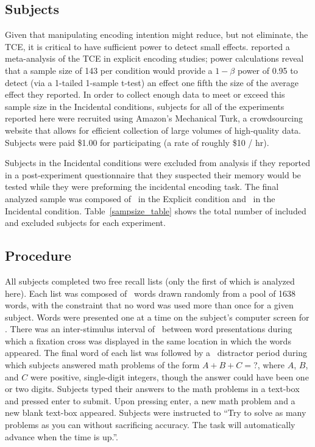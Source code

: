 \documentclass[man,natbib,floatsintext]{apa6} %
\begin{document}
\subsection{Subjects}

Given that manipulating encoding intention might reduce, but not eliminate, the TCE, it is critical to have sufficient power to detect small effects. \citet{SedeEtal10} reported a meta-analysis of the TCE in explicit encoding studies; power calculations reveal that a sample size of 143 per condition would provide a $1-\beta$ power of 0.95 to detect (via a 1-tailed 1-sample t-test) an effect one fifth the size of the average effect they reported. 
In order to collect enough data to meet or exceed this sample size in the Incidental conditions, subjects for all of the experiments reported here were recruited using Amazon's Mechanical Turk, a crowdsourcing website that allows for efficient collection of large volumes of high-quality data. Subjects were paid \$1.00 for participating (a rate of roughly \$10 / hr).

Subjects in the Incidental conditions were excluded from analysis if they reported in a post-experiment questionnaire that they suspected their memory would be tested while they were preforming the incidental encoding task. The final analyzed sample was composed of \shoeExplicitIncluded~in the Explicit condition and \shoeIncidentalIncluded~in the Incidental condition. Table~\ref{sampsize_table} shows the total number of included and excluded subjects for each experiment.

\subsection{Procedure}
All subjects completed two free recall lists (only the first of which is analyzed here). Each list was composed of \listlength~words drawn randomly from a pool of 1638 words, with the constraint that no word was used more than once for a given subject. Words were presented one at a time on the subject's computer screen for \presrate. 
There was an inter-stimulus interval of \isi~between word presentations during which a fixation cross was displayed in the same location in which the words appeared. The final word of each list was followed by a \DFRDelay~distractor period during which subjects answered math problems of the form $A+B+C=$?, where $A$, $B$, and $C$ were positive, single-digit integers, though the answer could have been one or two digits. Subjects typed their answers to the math problems in a text-box and pressed enter to submit. Upon pressing enter, a new math problem and a new blank text-box appeared. Subjects were instructed to ``Try to solve as many problems as you can without sacrificing accuracy. The task will automatically advance when the time is up.''.
\end{document}
